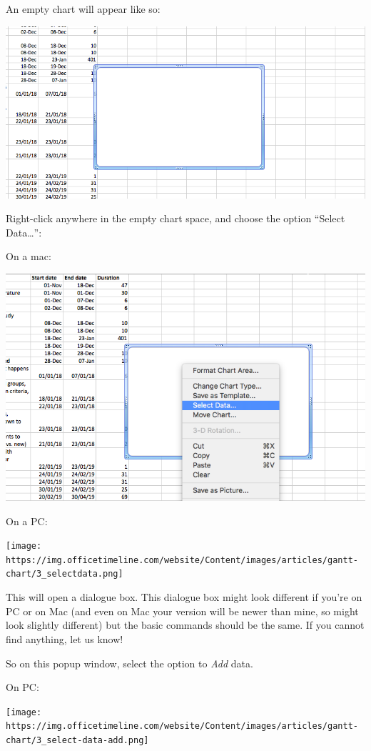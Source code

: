 \documentclass[
]{book}
\begin{document}
An empty chart will appear like so:

\includegraphics{imgs/gantt_empty_chart.png}

Right-click anywhere in the empty chart space, and choose the option ``Select Data\ldots{}'':

On a mac:

\includegraphics{imgs/gantt_select_data.png}

On a PC:

\texttt{[image: https://img.officetimeline.com/website/Content/images/articles/gantt-chart/3\_selectdata.png]}

This will open a dialogue box. This dialogue box might look different if you're on PC or on Mac (and even on Mac your version will be newer than mine, so might look slightly different) but the basic commands should be the same. If you cannot find anything, let us know!

So on this popup window, select the option to \emph{Add} data.

On PC:

\texttt{[image: https://img.officetimeline.com/website/Content/images/articles/gantt-chart/3\_select-data-add.png]}
\end{document}
